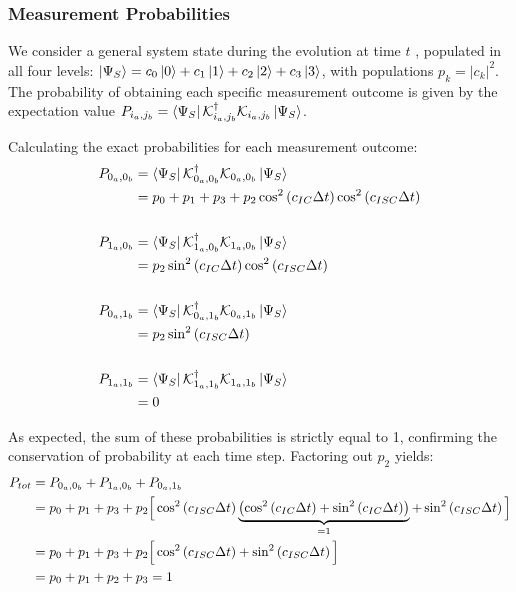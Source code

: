 \documentclass[a4paper,12pt]{article}
\begin{document}
\subsubsection{Measurement Probabilities}

We consider a general system state during the evolution at time $ t $ , populated in all four levels: $ \ket{\Psi_{S}} = c_{0} \ket{0} + c_{1} \ket{1} + c_{2} \ket{2} + c_{3} \ket{3} $, with populations $ p_{k} = |c_{k}|^{2} $.
The probability of obtaining each specific measurement outcome is given by the expectation value $ P_{i_a, j_b} = \bra{\Psi_{S}} \mathcal{K}_{i_a, j_b}^{\dagger} \mathcal{K}_{i_a, j_b} \ket{\Psi_{S}} $.

Calculating the exact probabilities for each measurement outcome:
\begin{align}
	P_{0_a, 0_b} &= \bra{\Psi_{S}} \mathcal{K}_{0_a, 0_b}^{\dagger} \mathcal{K}_{0_a, 0_b} \ket{\Psi_{S}} \notag \\
	&= p_{0} + p_{1} + p_{3} + p_{2} \cos^2 \left( c_{IC} \Delta t \right) \cos^2 \left( c_{ISC} \Delta t \right) \\
	\notag \\
	P_{1_a, 0_b} &= \bra{\Psi_{S}} \mathcal{K}_{1_a, 0_b}^{\dagger} \mathcal{K}_{1_a, 0_b} \ket{\Psi_{S}} \notag \\
	&= p_{2} \sin^2 \left( c_{IC} \Delta t \right) \cos^2 \left( c_{ISC} \Delta t \right) \\
	\notag \\
	P_{0_a, 1_b} &= \bra{\Psi_{S}} \mathcal{K}_{0_a, 1_b}^{\dagger} \mathcal{K}_{0_a, 1_b} \ket{\Psi_{S}} \notag \\
	&= p_{2} \sin^2 \left( c_{ISC} \Delta t \right) \\
	\notag \\
	P_{1_a, 1_b} &= \bra{\Psi_{S}} \mathcal{K}_{1_a, 1_b}^{\dagger} \mathcal{K}_{1_a, 1_b} \ket{\Psi_{S}} \notag \\
	&= 0
\end{align}

As expected, the sum of these probabilities is strictly equal to 1, confirming the conservation of probability at each time step. Factoring out $ p_2 $ yields:
\begin{align}
	P_{tot} &= P_{0_a, 0_b} + P_{1_a, 0_b} + P_{0_a, 1_b} \notag \\
	&= p_{0} + p_{1} + p_{3} + p_{2} \Big[ \cos^2 \left( c_{ISC} \Delta t \right) \underbrace{\left( \cos^2 \left( c_{IC} \Delta t \right) + \sin^2 \left( c_{IC} \Delta t \right) \right)}_{= 1} + \sin^2 \left( c_{ISC} \Delta t \right) \Big] \notag \\
	&= p_{0} + p_{1} + p_{3} + p_{2} \Big[ \cos^2 \left( c_{ISC} \Delta t \right) + \sin^2 \left( c_{ISC} \Delta t \right) \Big] \notag \\
	&= p_{0} + p_{1} + p_{2} + p_{3} = 1
\end{align}
\end{document}
